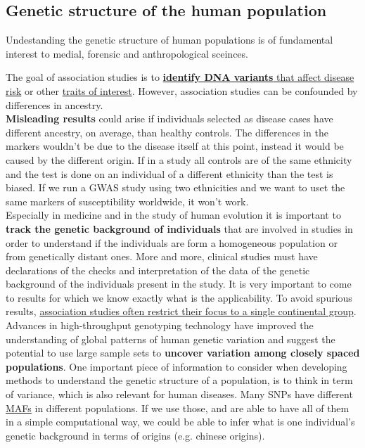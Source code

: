 \subsection{Genetic structure of the human population}

Undestanding the genetic structure of human populations is of fundamental
interest to medial, forensic and anthropological sceinces. 

The goal of association studies is to \underline{\textbf{identify DNA variants}
that affect disease risk} or other \underline{traits of interest}. However,
association studies can be confounded by differences in ancestry. \\
	
\textbf{Misleading results} could arise if individuals selected as disease cases
have different ancestry, on average, than healthy controls. The differences in
the markers wouldn't be due to the disease itself at this point, instead it
would be caused by the different origin. If in a study all controls are of the
same ethnicity and the test is done on an individual of a different ethnicity
than the test is biased. If we run a GWAS study using two ethnicities and we
want to uset the same markers of susceptibility worldwide, it won't work. \\

Especially in medicine and in the study of human evolution it is important to
\textbf{track the genetic background of individuals} that are involved in
studies in order to understand if the individuals are form a homogeneous
population or from genetically distant ones. More and more, clinical studies
must have declarations of the checks and interpretation of the data of the
genetic background of the individuals present in the study. It is very important
to come to results for which we know exactly what is the applicability. To avoid
spurious results, \underline{association studies often restrict their focus to a
single continental group}.\\

Advances in high-throughput genotyping technology have improved the
understanding of global patterns of human genetic variation and suggest the
potential to use large sample sets to \textbf{uncover variation among closely
spaced populations}. One important piece of information to consider when
developing methods to understand the genetic structure of a population, is to
think in term of variance, which is also relevant for human diseases. Many SNPs
have different \underline{MAFs} in different populations. If we use those, and
are able to have all of them in a simple computational way, we could be able to
infer what is one individual's genetic background in terms of origins (e.g.
chinese origins).\\

